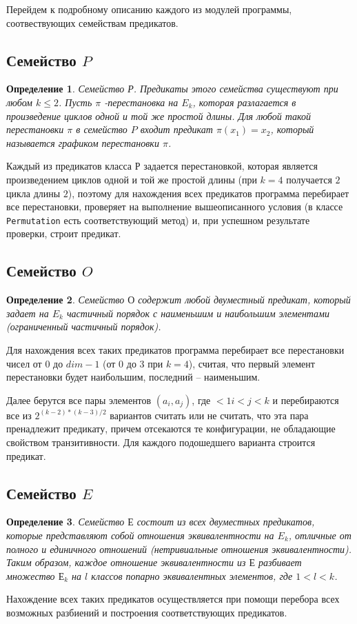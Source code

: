 \documentclass[a4paper,14pt]{extreport}
\newtheorem{opr}{Определение}
\begin{document}
Перейдем к подробному описанию каждого из модулей программы, соотвествующих семействам предикатов.

\subsection{Семейство $P$}
\begin{opr}
Семейство Р. Предикаты этого семейства существуют при любом $k \leqslant 2$. Пусть $\pi$ -перестановка на $E_k$, которая разлагается в произведение циклов одной и той же простой длины. Для любой такой перестановки $\pi$ в семейство $P$ входит предикат $\pi(x_1)=x_2$, который называется графиком перестановки $\pi$. 
\end{opr}

Каждый из предикатов класса $Р$ задается перестановкой, которая является произведением циклов одной и той же простой длины (при $k=4$ получается $2$ цикла длины $2$), поэтому для нахождения всех предикатов программа перебирает все перестановки, проверяет на выполнение вышеописанного условия (в классе {\tt Permutation} есть соответствующий метод) и, при успешном результате проверки, строит предикат.

\subsection{Семейство $O$}
\begin{opr}
Семейство $О$ содержит любой двуместный предикат, который задает на $E_k$ частичный порядок с
наименьшим и наибольшим элементами (ограниченный частичный порядок). 
\end{opr}

Для нахождения всех таких предикатов программа перебирает все перестановки чисел от $0$ до $dim-1$ (от $0$ до $3$ при $k=4$), считая, что первый элемент перестановки будет наибольшим, последний – наименьшим. 

Далее берутся все пары элементов $(a_i,a_j)$, где $<1i<j<k$ и перебираются все из $2^{(k-2)*(k-3)/2}$ вариантов считать или не считать, что эта пара пренадлежит предикату, причем отсекаются те конфигурации, не обладающие свойством транзитивности. Для каждого подошедшего варианта строится предикат.

\subsection{Семейство $E$}
\begin{opr}
Семейство $Е$ состоит из всех двуместных предикатов, которые  представляют собой отношения эквивалентности на $E_{k}$, отличные от полного и единичного отношений (нетривиальные отношения эквивалентности). Таким образом, каждое отношение эквивалентности из $Е$ разбивает множество $Е_{k}$ на $l$ классов попарно эквивалентных элементов, где $1 < l < k$. 
\end{opr}
Нахождение всех таких предикатов осуществляется при помощи перебора всех возможных разбиений и построения соответствующих предикатов. 
\end{document}
